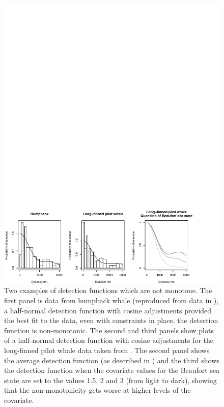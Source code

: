 \begin{figure}
\centering
\includegraphics[width=\textwidth]{mix/figs/figure1.pdf}
\caption{Two examples of detection functions which are not monotone. The first panel is data from humpback whale (reproduced from data in ), a half-normal detection function with cosine adjustments provided the best fit to the data, even with constraints in place, the detection function is non-monotonic. The second and third panels show plots of a half-normal detection function with cosine adjustments for the long-finned pilot whale data taken from \label{cor-e14}. The second panel shows the average detection function (as described in ) and the third shows the detection function when the covariate values for the Beaufort sea \label{cor-e13}state are set to the values 1.5, 2 and 3 (from light to dark), showing that the non-monotonicity gets worse at higher levels of the covariate.\label{cor-r64}\label{cor-e15}}
\label{fig1}
\end{figure}

